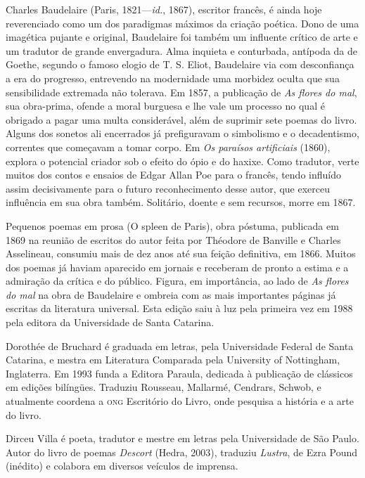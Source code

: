 \begin{resumopage}

\item[Charles Baudelaire] (Paris, 1821---\textit{id.}, 1867), escritor francês, é
 ainda hoje reverenciado como um dos paradigmas máximos da criação poética.
 Dono de uma imagética pujante e original, Baudelaire foi também um
 influente crítico de arte e um tradutor de grande envergadura. Alma
 inquieta e conturbada, antípoda da de Goethe, segundo o famoso elogio de
 T. S. Eliot, Baudelaire via com desconfiança a era do progresso,
 entrevendo na modernidade uma morbidez oculta que sua sensibilidade
 extremada não tolerava. Em 1857, a publicação de \textit{As flores do mal}, sua
 obra-prima, ofende a moral burguesa e lhe vale um processo no qual é
 obrigado a pagar uma multa considerável, além de suprimir sete poemas do livro.
 Alguns dos sonetos ali encerrados
 já prefiguravam o simbolismo e o decadentismo, correntes que começavam a
 tomar corpo. Em \textit{Os paraísos artificiais} (1860), explora o potencial
 criador sob o efeito do ópio e do haxixe. Como tradutor, verte
 muitos dos contos e ensaios de  Edgar Allan Poe para o francês, tendo influído assim decisivamente
 para o futuro reconhecimento desse autor, que 
 exerceu influência em sua obra também. Solitário, doente e sem recursos,
 morre em 1867.
\item[Pequenos poemas em prosa (O spleen de Paris),] obra póstuma, publicada em 1869 na reunião
 de escritos do autor feita por Théodore de Banville e Charles Asselineau,
 consumiu mais de dez anos até sua feição definitiva, em 1866. Muitos dos poemas
 já haviam aparecido em jornais e receberam de pronto a estima e a
 admiração da crítica e do público. Figura, em importância, ao lado de
 \textit{As flores do mal} na obra de Baudelaire e ombreia com
 as mais importantes páginas já escritas da literatura universal. Esta edição
saiu à luz pela primeira vez em 1988 pela editora da Universidade de Santa Catarina.
\item[Dorothée de Bruchard] é graduada em letras, pela Universidade Federal
 de Santa Catarina, e mestra em Literatura Comparada pela University of
 Nottingham, Inglaterra. Em 1993 funda a Editora Paraula, dedicada à
 publicação de clássicos em edições bilíngües. Traduziu Rousseau, Mallarmé,
 Cendrars, Schwob, e atualmente coordena a \textsc{ong} Escritório do Livro, onde
 pesquisa a história e a arte do livro.
\item[Dirceu Villa] é poeta, tradutor e mestre em letras pela Universidade
 de São Paulo. Autor do livro de poemas \textit{Descort} (Hedra, 2003), traduziu
 \textit{Lustra}, de Ezra Pound (inédito) e colabora em diversos veículos de imprensa.
\end{resumopage}

